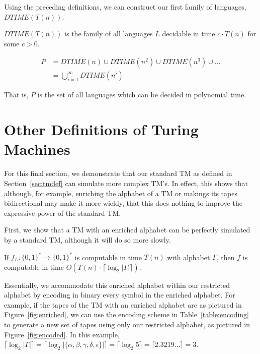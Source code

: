 \documentclass[usletter]{article}
\begin{document}
Using the preceding definitions, we can construct our first family of languages, $DTIME(T(n))$.

\begin{definition}
$DTIME(T(n))$ is the family of all languages $L$ decidable in time $c\cdot T(n)$ for some $c>0$.
\end{definition}

\begin{definition}
\begin{align}
P &= DTIME(n) \cup DTIME(n^2) \cup DTIME(n^3) \cup \dots\\
&= \bigcup\limits_{i=1}^{\infty} DTIME(n^i)
\end{align}
\end{definition}

That is, $P$ is the set of all languages which can be decided in polynomial time.

\section{Other Definitions of Turing Machines}

For this final section, we demonstrate that our standard TM as defined in Section~\ref{sec:tmdef} can simulate more complex TM's. In effect, this shows that although, for example, enriching the alphabet of a TM or makings its tapes bidirectional may make it more wieldy, that this does nothing to improve the expressive power of the standard TM.

First, we show that a TM with an enriched alphabet can be perfectly simulated by a standard TM, although it will do so more slowly.

\begin{definition}
If $f_L : \{0,1\}^* \rightarrow \{0,1\}^*$ is computable in time $T(n)$ with alphabet $\Gamma$, then $f$ is computable in time $O(T(n)\cdot \lceil\log_2|\Gamma|\rceil)$.
\end{definition}

Essentially, we accommodate this enriched alphabet within our restricted alphabet by encoding in binary every symbol in the enriched alphabet. For example, if the tapes of the TM with an enriched alphabet are as pictured in Figure~\ref{fig:enriched}, we can use the encoding scheme in Table~\ref{table:encoding} to generate a new set of tapes using only our restricted alphabet, as pictured in Figure~\ref{fig:encoded}. In this example, $\lceil\log_2|\Gamma|\rceil = \lceil\log_2|\{\alpha,\beta,\gamma,\delta,\epsilon\}|\rceil = \lceil\log_2 5\rceil = \lceil 2.3219\dots\rceil = 3$.
\end{document}
